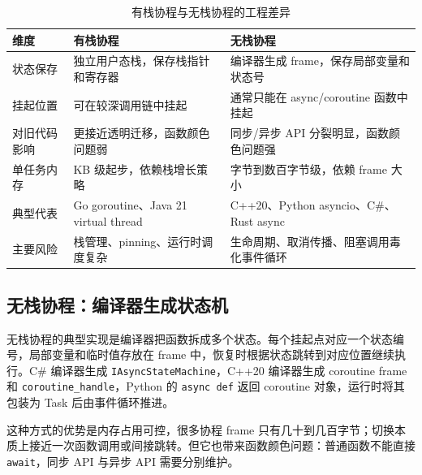 \documentclass[UTF8,a4paper,12pt]{ctexart}
\begin{document}
\begin{table}[H]
  \centering
  \caption{有栈协程与无栈协程的工程差异}
  \begin{tabularx}{\textwidth}{lXX}
    \toprule
    维度 & 有栈协程 & 无栈协程 \\
    \midrule
    状态保存 & 独立用户态栈，保存栈指针和寄存器 & 编译器生成 frame，保存局部变量和状态号 \\
    挂起位置 & 可在较深调用链中挂起 & 通常只能在 async/coroutine 函数中挂起 \\
    对旧代码影响 & 更接近透明迁移，函数颜色问题弱 & 同步/异步 API 分裂明显，函数颜色问题强 \\
    单任务内存 & KB 级起步，依赖栈增长策略 & 字节到数百字节级，依赖 frame 大小 \\
    典型代表 & Go goroutine、Java 21 virtual thread & C++20、Python asyncio、C\#、Rust async \\
    主要风险 & 栈管理、pinning、运行时调度复杂 & 生命周期、取消传播、阻塞调用毒化事件循环 \\
    \bottomrule
  \end{tabularx}
  \label{tab:stackful-stackless}
\end{table}

\subsection{无栈协程：编译器生成状态机}

无栈协程的典型实现是编译器把函数拆成多个状态。每个挂起点对应一个状态编号，局部变量和临时值存放在 frame 中，恢复时根据状态跳转到对应位置继续执行。C\# 编译器生成 \verb|IAsyncStateMachine|，C++20 编译器生成 coroutine frame 和 \verb|coroutine_handle|，Python 的 \verb|async def| 返回 coroutine 对象，运行时将其包装为 Task 后由事件循环推进\cite{pep492}。

这种方式的优势是内存占用可控，很多协程 frame 只有几十到几百字节；切换本质上接近一次函数调用或间接跳转。但它也带来函数颜色问题：普通函数不能直接 \verb|await|，同步 API 与异步 API 需要分别维护。
\end{document}
